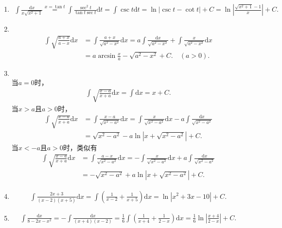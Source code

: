 \begin{solution}
\begin{enumerate}
    \item[14.]
    \[
    \begin{aligned}
    \int\frac{\mathrm{d}x}{x\sqrt{x^2+1}}\overset{x=\tan{t}}{=}\int\frac{\sec^2{t}}{\tan{t}\sec{t}}\mathrm{d}t=\int\csc{t}\mathrm{d}t=\ln\left|\csc{t}-\cot{t}\right|+C=\ln\left|\frac{\sqrt{x^2+1}-1}{x}\right|+C.
    \end{aligned}
    \]

    \item[15.]\\
    \[
    \begin{aligned}
    \int\sqrt{\frac{a+x}{a-x}}\mathrm{d}x&=\int\frac{a+x}{\sqrt{a^2-x^2}}\mathrm{d}x=a\int\frac{\mathrm{d}x}{\sqrt{a^2-x^2}}+\int\frac{x}{\sqrt{a^2-x^2}}\mathrm{d}x\\
    &=a\arcsin{\frac{x}{a}}-\sqrt{a^2-x^2}+C.\quad(a>0).
    \end{aligned}
    \]

    \item[16.]\\
    当$a=0$时，
    \[
    \begin{aligned}
    \int\sqrt{\frac{x-a}{x+a}}\mathrm{d}x=\int \mathrm{d}x=x+C.
    \end{aligned}
    \]
    当$x>a$且$a>0$时，
    \[
    \begin{aligned}
    \int\sqrt{\frac{x-a}{x+a}}\mathrm{d}x&=\int\frac{x-a}{\sqrt{x^2-a^2}}\mathrm{d}x=\int\frac{x}{\sqrt{x^2-a^2}}\mathrm{d}x-a\int\frac{\mathrm{d}x}{\sqrt{x^2-a^2}}\\
    &=\sqrt{x^2-a^2}-a\ln\left|x+\sqrt{x^2-a^2}\right|+C.
    \end{aligned}
    \]
    当$x<-a$且$a>0$时，类似有
    \[
    \begin{aligned}
    \int\sqrt{\frac{x-a}{x+a}}\mathrm{d}x&=\int\frac{a-x}{\sqrt{x^2-a^2}}\mathrm{d}x=-\int\frac{x}{\sqrt{x^2-a^2}}\mathrm{d}x+a\int\frac{\mathrm{d}x}{\sqrt{x^2-a^2}}\\
    &=-\sqrt{x^2-a^2}+a\ln\left|x+\sqrt{x^2-a^2}\right|+C.
    \end{aligned}
    \]

    \item[17.]
    \[
    \begin{aligned}
    \int\frac{2x+3}{(x-2)(x+5)}\mathrm{d}x=\int\left(\frac{1}{x-2}+\frac{1}{x+5}\right)\mathrm{d}x=\ln\left|x^2+3x-10\right|+C.
    \end{aligned}
    \]

    \item[18.]
    \[
    \begin{aligned}
    \int\frac{\mathrm{d}x}{8-2x-x^2}=-\int\frac{\mathrm{d}x}{(x+4)(x-2)}=\frac{1}{6}\int\left(\frac{1}{x+4}+\frac{1}{2-x}\right)\mathrm{d}x=\frac{1}{6}\ln\left|\frac{x+4}{2-x}\right|+C.
    \end{aligned}
    \]


\end{enumerate}
\end{solution}
